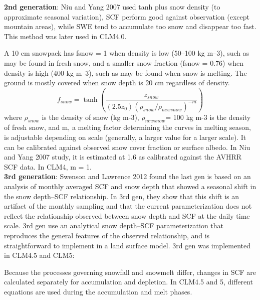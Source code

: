 \documentclass[twoside,10pt]{report}
\begin{document}
\textbf{2nd generation}: Niu and Yang 2007 used tanh plus snow density (to approximate seasonal variation), SCF perform good against observation (except mountain areas), while SWE tend to accumulate too snow and disappear too fast. This method was later used in CLM4.0. 

A 10 cm snowpack has fsnow = 1 when density is low (50–100 kg m–3), such as may be found in fresh snow, and a smaller snow fraction (fsnow = 0.76) when density is high (400 kg m–3), such as may be found when snow is melting. The ground is mostly covered when snow depth is 20 cm regardless of density.
\begin{equation}
f_{snow} = \tanh( \frac{z_{snow}}{(2.5 z_0  ) (\rho_{snow}/\rho_{newsnow} )^{-m}} )
\end{equation}
where $\rho_{snow}$ is the density of snow (kg m-3), $\rho_{newsnow}$= 100 kg m-3 is the density of fresh snow, and m, a melting factor determining the curves in melting season, is adjustable depending on scale (generally, a larger value for a larger scale). It can be calibrated against observed snow cover fraction or surface albedo. In Niu and Yang 2007 study, it is estimated at 1.6 as calibrated against the AVHRR SCF data. In CLM4,  m = 1.\\
\textbf{3rd generation}: Swenson and Lawrence 2012 found the last gen is based on an analysis of monthly averaged SCF and snow depth that showed a seasonal shift in the snow depth–SCF relationship. In 3rd gen, they show that this shift is an artifact of the monthly sampling and that the current parameterization does not reflect the relationship observed between snow depth and SCF at the daily time scale. 
3rd gen use an analytical snow depth–SCF parameterization that reproduces the general features of the observed relationship, and is straightforward to implement in a land surface model. 
3rd gen was implemented in CLM4.5 and CLM5:

Because the processes governing snowfall and snowmelt differ, changes in SCF are calculated separately for accumulation and depletion. In CLM4.5 and 5, different equations are used during the accumulation and melt phases. 
\end{document}
